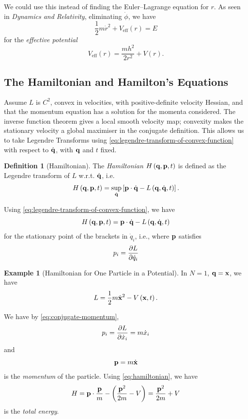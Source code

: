 \documentclass[11pt]{article}
\numberwithin{equation}{section}
\theoremstyle{definition}
\newtheorem{definition}[theorem]{Definition}
\newtheorem{example}[theorem]{Example}
\theoremstyle{remark}
\newcommand{\pqty}[1]{\left(#1\right)}
\newcommand{\bqty}[1]{\left[#1\right]}
\newcommand{\vdot}{\cdot}
\begin{document}
We could use this instead of finding the Euler--Lagrange equation for \(r\). As seen in \textit{Dynamics and Relativity}, eliminating \(\dot{\phi}\), we have
\[
    \frac{1}{2} m \dot{r}^2 + V_{\text{eff}} \pqty{r} = E
\]
for the \emph{effective potential}
\[
    V_{\text{eff}} \pqty{r} = \frac{m h^2}{2 r^2} + V\pqty{r}.
\]

\subsection{The Hamiltonian and Hamilton's Equations}

Assume \(L\) is \(C^2\), convex in velocities, with positive-definite velocity Hessian, and that the momentum equation has a solution for the momenta considered. The inverse function theorem gives a local smooth velocity map; convexity makes the stationary velocity a global maximiser in the conjugate definition. This allows us to take Legendre Transforms using \autoref{eq:legendre-transform-of-convex-function} with respect to \(\dot{\vb{q}}\), with \(\vb{q}\) and \(t\) fixed.

\begin{definition}[Hamiltonian]\label{variation-unit-0064}
    The \emph{Hamiltonian} \(H \pqty{\vb{q}, \vb{p}, t}\) is defined as the Legendre transform of \(L\) w.r.t. \(\dot{\vb{q}}\), i.e.
    \begin{equation}
        \label{eq:hamiltonian}%
        H \pqty{\vb{q}, \vb{p}, t} = \sup_{\dot{\vb{q}}} \bqty{\vb{p} \vdot \dot{\vb{q}} - L \pqty{\vb{q}, \dot{\vb{q}}, t}}.
    \end{equation}
\end{definition}

Using \autoref{eq:legendre-transform-of-convex-function}, we have
\[
    H\pqty{\vb{q}, \vb{p}, t} = \vb{p} \vdot \dot{\vb{q}} - L\pqty{\vb{q}, \dot{\vb{q}}, t}
\]
for the stationary point of the brackets in \(\dot{q}_i\), i.e., where \(\vb{p}\) satisfies
\begin{equation}
    \label{eq:conjugate-momentum}%
    p_i = \pdv{L}{\dot{q}_i}
\end{equation}

\begin{example}[Hamiltonian for One Particle in a Potential]\label{variation-unit-0065}
    In \(N = 1\), \(\vb{q} = \vb{x}\), we have
    \[
        L = \frac{1}{2} m \dot{\vb{x}}^2 - V \pqty{\vb{x}, t}.
    \]

    We have by \autoref{eq:conjugate-momentum},
    \[
        p_i = \pdv{L}{\dot{x}_i} = m \dot{x}_i
    \]
    and
    \[
        \vb{p} = m \dot{\vb{x}}
    \]
    is the \emph{momentum} of the particle. Using \autoref{eq:hamiltonian}, we have
    \[
        H = \vb{p} \vdot \frac{\vb{p}}{m} - \pqty{\frac{\vb{p}^2}{2m} - V} = \frac{\vb{p}^2}{2m} + V
    \]
    is the \emph{total energy}.
\end{example}
\end{document}
